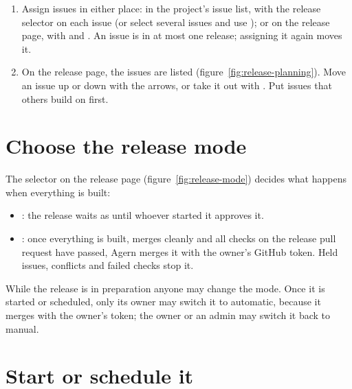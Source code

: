 \begin{enumerate}
  \item Assign issues in either place: in the project's issue list, with the release selector on
    each issue (or select several issues and use ); or on the release page, with
     and . An issue is in at most one release; assigning it again
    moves it.
  \item On the release page, the issues are listed 
    (figure~\ref{fig:release-planning}). Move an issue up or down with the arrows, or take it out
    with . Put issues that others build on first.
\end{enumerate}


\section{Choose the release mode}\label{sec:release-mode}

The  selector on the release page (figure~\ref{fig:release-mode}) decides what
happens when everything is built:

\begin{itemize}
  \item {}: the release waits as  until whoever started it
    approves it.
  \item {}: once everything is built, merges cleanly and all checks on the release pull
    request have passed, Agern merges it with the owner's GitHub token. Held issues, conflicts and
    failed checks stop it.
\end{itemize}

While the release is in preparation anyone may change the mode. Once it is started or scheduled,
only its owner may switch it to automatic, because it merges with the owner's token; the owner or
an admin may switch it back to manual.


\section{Start or schedule it}\label{sec:start-release}


